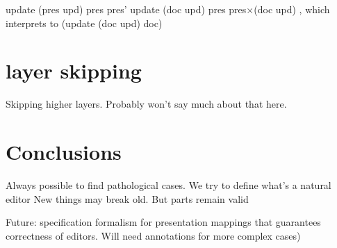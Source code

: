update (pres upd) pres \rarr pres'
update (doc upd) pres \rarr pres$\times$(doc upd) , which interprets to (update (doc upd) doc)


%																
%																
%																
\section{layer skipping}
Skipping higher layers. Probably won't say much about that here.

\section{Conclusions}

Always possible to find pathological cases.
We try to define what's a natural editor
New things may break old. But parts remain valid

Future: specification formalism for presentation mappings that guarantees correctness of editors. Will need annotations for more complex cases)
\renewcommand{\present}[0]{{\tt present}}					%
\renewcommand{\interpret}[0]{{\tt interpret}}				%
\renewcommand{\Core}[0]{\ensuremath{\mathit{Core}}}	%
                                 